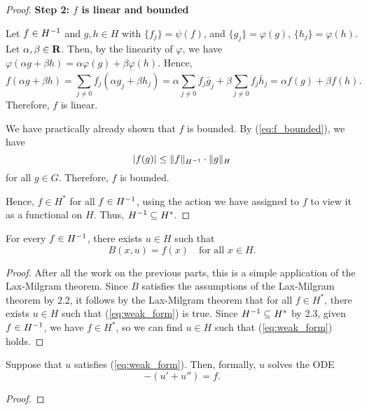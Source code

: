 \documentclass{homework}
\begin{document}
\begin{arabicparts}
\begin{proof}
			\textbf{Step 2: $f$ is linear and bounded}
			
			Let $f \in {H^{-1}}$ and $g,h \in H$ with $\{f_j\} = \psi(f)$, and $\{g_j\} = \varphi(g)$, $\{h_j\} = \varphi(h)$. Let $\alpha,\beta\in\textnormal{\bf R}$. Then, by the linearity of $\varphi$, we have $\varphi(\alpha g + \beta h) = \alpha\varphi(g) + \beta\varphi(h)$. Hence,
			\begin{equation}
				f(\alpha g + \beta h) = \sum_{j\ne0} f_j\overline{(\alpha g_j + \beta h_j)} = \alpha\sum_{j\ne0}f_j\bar{g}_j + \beta\sum_{j\ne0}f_j\bar{h}_j = \alpha f(g) + \beta f(h).
			\end{equation}
			Therefore, $f$ is linear.
			
			We have practically already shown that $f$ is bounded. By (\ref{eq:f_bounded}), we have
			\begin{equation}
				|f(g)| \le \lVert f\rVert_{H^{-1}}\cdot\lVert g\rVert_H
			\end{equation}
			for all $g \in G$. Therefore, $f$ is bounded.
			
			Hence, $f \in H^*$ for all $f \in {H^{-1}}$, using the action we have assigned to $f$ to view it as a functional on $H$. Thus, ${H^{-1}} \subseteq H^*$.
		\end{proof}
		
		\questionpart
		For every $f \in {H^{-1}}$, there exists $u \in H$ such that
		\begin{equation}
			\label{eq:weak_form}
			B(x,u) = f(x) \quad\text{for all } x\in H.
		\end{equation}
		
		\begin{proof}
			After all the work on the previous parts, this is a simple application of the Lax-Milgram theorem. Since $B$ satisfies the assumptions of the Lax-Milgram theorem by 2.2, it follows by the Lax-Milgram theorem that for all $f \in H^*$, there exists $u \in H$ such that (\ref{eq:weak_form}) is true. Since ${H^{-1}} \subseteq H^*$ by 2.3, given $f \in {H^{-1}}$, we have $f \in H^*$, so we can find $u\in H$ such that (\ref{eq:weak_form}) holds.
		\end{proof}
		
		\questionpart
		Suppose that $u$ satisfies (\ref{eq:weak_form}). Then, formally, $u$ solves the ODE
		\begin{equation}
			-(u' + u'')= f.
		\end{equation}
		\begin{proof}
			

\end{proof}
\end{arabicparts}
\end{document}

